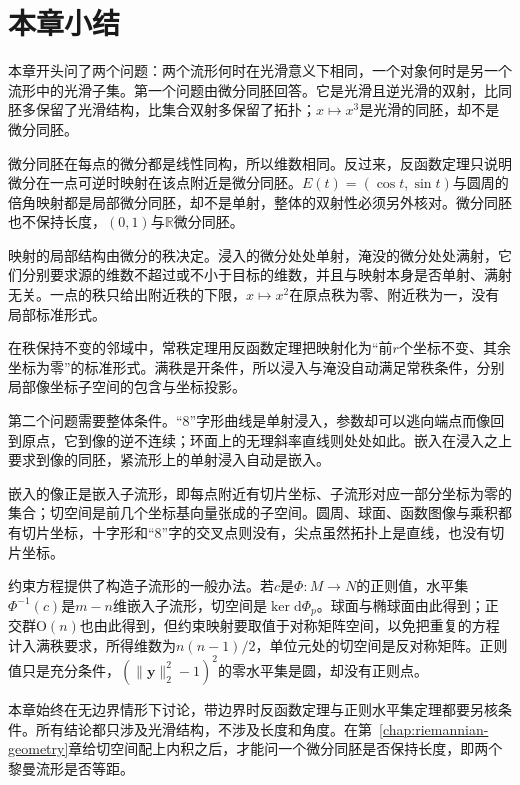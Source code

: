 \section{本章小结}
\label{sec:mrel-summary}

本章开头问了两个问题：两个流形何时在光滑意义下相同，一个对象何时是另一个流形中的光滑子集。第一个问题由微分同胚回答。它是光滑且逆光滑的双射，比同胚多保留了光滑结构，比集合双射多保留了拓扑；$x\mapsto x^3$是光滑的同胚，却不是微分同胚。

微分同胚在每点的微分都是线性同构，所以维数相同。反过来，反函数定理只说明微分在一点可逆时映射在该点附近是微分同胚。$E(t)=(\cos t,\sin t)$与圆周的倍角映射都是局部微分同胚，却不是单射，整体的双射性必须另外核对。微分同胚也不保持长度，$(0,1)$与$\mathbb R$微分同胚。

映射的局部结构由微分的秩决定。浸入的微分处处单射，淹没的微分处处满射，它们分别要求源的维数不超过或不小于目标的维数，并且与映射本身是否单射、满射无关。一点的秩只给出附近秩的下限，$x\mapsto x^2$在原点秩为零、附近秩为一，没有局部标准形式。

在秩保持不变的邻域中，常秩定理用反函数定理把映射化为“前$r$个坐标不变、其余坐标为零”的标准形式。满秩是开条件，所以浸入与淹没自动满足常秩条件，分别局部像坐标子空间的包含与坐标投影。

第二个问题需要整体条件。“8”字形曲线是单射浸入，参数却可以逃向端点而像回到原点，它到像的逆不连续；环面上的无理斜率直线则处处如此。嵌入在浸入之上要求到像的同胚，紧流形上的单射浸入自动是嵌入。

嵌入的像正是嵌入子流形，即每点附近有切片坐标、子流形对应一部分坐标为零的集合；切空间是前几个坐标基向量张成的子空间。圆周、球面、函数图像与乘积都有切片坐标，十字形和“8”字的交叉点则没有，尖点虽然拓扑上是直线，也没有切片坐标。

约束方程提供了构造子流形的一般办法。若$c$是$\Phi:M\to N$的正则值，水平集$\Phi^{-1}(c)$是$m-n$维嵌入子流形，切空间是$\ker\mathrm d\Phi_p$。球面与椭球面由此得到；正交群$\mathrm O(n)$也由此得到，但约束映射要取值于对称矩阵空间，以免把重复的方程计入满秩要求，所得维数为$n(n-1)/2$，单位元处的切空间是反对称矩阵。正则值只是充分条件，$(\lVert\bm y\rVert_2^2-1)^2$的零水平集是圆，却没有正则点。

本章始终在无边界情形下讨论，带边界时反函数定理与正则水平集定理都要另核条件。所有结论都只涉及光滑结构，不涉及长度和角度。在第~\ref{chap:riemannian-geometry}章给切空间配上内积之后，才能问一个微分同胚是否保持长度，即两个黎曼流形是否等距。
